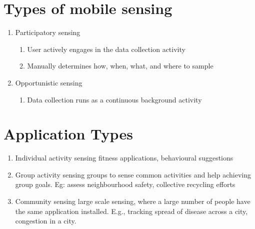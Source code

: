 \section{Types of mobile sensing}  

\begin{enumerate}
    \item  Participatory sensing
    
    \begin{enumerate}
        \item  User actively engages in the data collection activity

        \item  Manually determines how, when, what, and where to sample
   
    \end{enumerate}
            
    \item  Opportunistic sensing
    
        \begin{enumerate}
        \item   Data collection runs as a continuous background activity

    \end{enumerate}
\end{enumerate}

\section{Application Types}

    \begin{enumerate}
        \item  Individual activity sensing fitness applications, behavioural suggestions

        \item  Group activity sensing groups to sense common activities and help achieving group goals. Eg: assess neighbourhood safety, collective recycling efforts 
        
        \item Community sensing large scale sensing, where a large number of people have the same application installed. E.g., tracking spread of disease across a city, congestion in a city.
    \end{enumerate}
    
